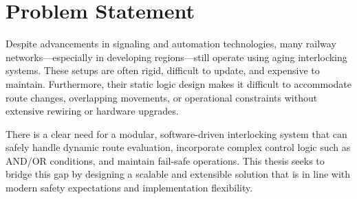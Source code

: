 \section{Problem Statement}
Despite advancements in signaling and automation technologies, many railway networks—especially in developing regions—still operate using aging interlocking systems. These setups are often rigid, difficult to update, and expensive to maintain. Furthermore, their static logic design makes it difficult to accommodate route changes, overlapping movements, or operational constraints without extensive rewiring or hardware upgrades.

There is a clear need for a modular, software-driven interlocking system that can safely handle dynamic route evaluation, incorporate complex control logic such as AND/OR conditions, and maintain fail-safe operations. This thesis seeks to bridge this gap by designing a scalable and extensible solution that is in line with modern safety expectations and implementation flexibility.
